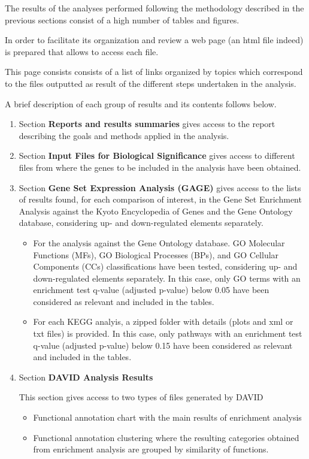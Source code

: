 \documentclass{article}\usepackage[]{graphicx}\usepackage[]{color}
\begin{document}
The results of the analyses performed following the methodology described in the previous sections consist  of a  high number of tables and figures.

In order to facilitate its organization and review a web page (an html file indeed) is prepared that allows to access each file.

This page consists consists of a list of links organized by topics which correspond to the files outputted as result of the different steps undertaken in the analysis.

A brief description of each group of results and its contents follows below.

\begin{enumerate}
 \item Section \textbf{Reports and results summaries} gives access to the report describing the goals and methods applied in the analysis.
\item Section \textbf{Input Files for Biological Significance} gives access to different files from where the genes to be included in the analysis have been obtained.
\item Section \textbf{Gene Set Expression Analysis (GAGE)} gives access to the lists of results found, for each comparison of interest, in the Gene Set Enrichment Analysis against the Kyoto Encyclopedia of Genes and the Gene Ontology database, considering up- and down-regulated elements separately. 
\begin{itemize}
\item For the analysis against the Gene Ontology database. GO Molecular Functions (MFs), GO Biological Processes (BPs), and GO Cellular Components (CCs) classifications have been tested, considering up- and down-regulated elements separately. In this case, only GO terms with an enrichment test q-value (adjusted p-value) below 0.05 have been considered as relevant and included in the tables.
\item For each KEGG analyis, a zipped folder with details (plots and xml or txt files) is provided. In this case, only pathways with an enrichment test q-value (adjusted p-value) below 0.15 have been considered as relevant and included in the tables.
\end{itemize}

\item Section \textbf{DAVID Analysis Results}

This section gives access to two types of files generated by DAVID
\begin{itemize}
  \item Functional annotation chart with the main results of enrichment analysis
  \item Functional annotation clustering where the resulting categories obtained from enrichment analysis are grouped by similarity of functions.
\end{itemize}



\end{enumerate}
\end{document}
